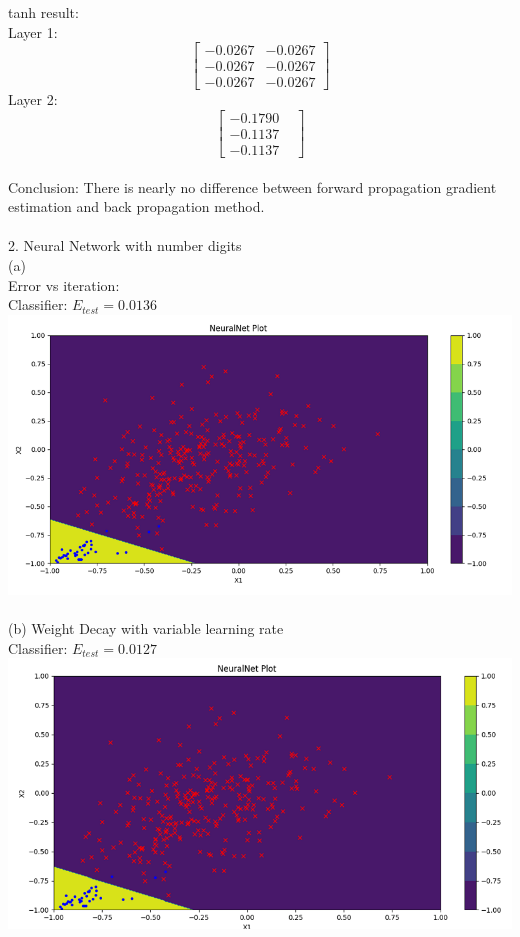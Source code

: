 \documentclass[12pt]{article}
\begin{document}
tanh result:\\
Layer 1:\\
\[
\begin{bmatrix}
    -0.0267 & -0.0267 \\
    -0.0267 & -0.0267 \\
    -0.0267 & -0.0267
\end{bmatrix}
\]
Layer 2:\\
\[
\begin{bmatrix}
    -0.1790 &\\
    -0.1137 &\\
    -0.1137 &
\end{bmatrix}
\]\\
Conclusion: There is nearly no difference between forward propagation gradient estimation and back propagation method. \\\\
2. Neural Network with number digits\\
(a)\\
Error vs iteration:\\
Classifier: $E_{test}=0.0136$ \\
\includegraphics[scale=0.6]{images/nn1}\\\\
(b) Weight Decay with variable learning rate\\
Classifier: $E_{test}=0.0127$\\
\includegraphics[scale=0.6]{images/nn2}\\\\
\end{document}
